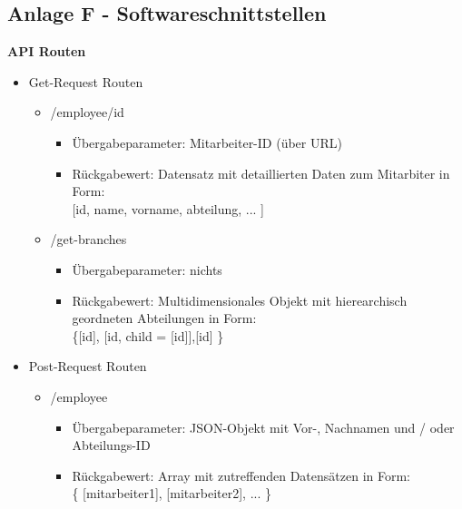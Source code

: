 \subsection{Anlage F - Softwareschnittstellen}
\textbf{API Routen}
\begin{itemize}
    \item Get-Request Routen
    \begin{itemize}
        \item /employee/{id}
        \begin{itemize}
            \item Übergabeparameter: Mitarbeiter-ID (über URL)
            \item Rückgabewert: Datensatz mit detaillierten Daten zum Mitarbiter in Form:\\
            {[id, name, vorname, abteilung, ... ]}
        \end{itemize}
        \item /get-branches
        \begin{itemize}
            \item Übergabeparameter: nichts
            \item Rückgabewert: Multidimensionales Objekt mit hierearchisch geordneten Abteilungen in Form:\\
            \{[id], [id, child = [id]],[id] \}
        \end{itemize}
    \end{itemize}

    \item Post-Request Routen
    \begin{itemize}
        \item /employee
        \begin{itemize}
            \item Übergabeparameter: JSON-Objekt mit Vor-, Nachnamen und / oder Abteilungs-ID
            \item Rückgabewert: Array mit zutreffenden Datensätzen in Form:\\
            \{ {[}mitarbeiter1{]}, {[}mitarbeiter2{]}, ... \}

        \end{itemize}
    \end{itemize}
\end{itemize}
\pagebreak

